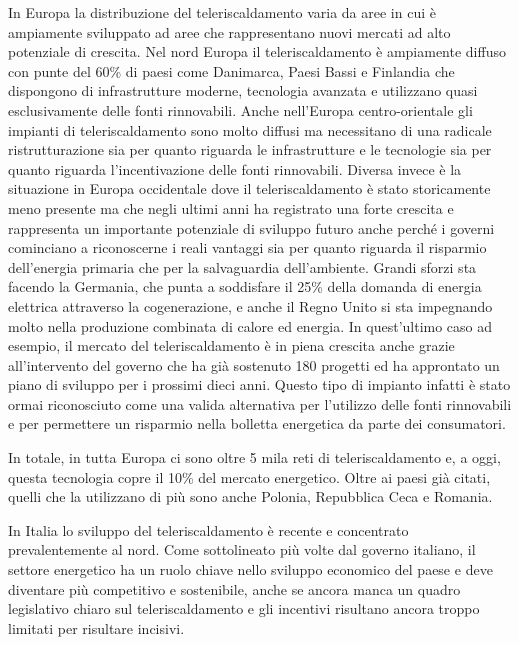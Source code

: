 \documentclass[laurea,oneside,11pt]{USiena_tesiLM}
\begin{document}
In Europa la distribuzione del teleriscaldamento varia da aree in cui è ampiamente sviluppato ad aree che rappresentano nuovi mercati ad alto potenziale di crescita.
Nel nord Europa il teleriscaldamento è ampiamente diffuso con punte del 60\% di paesi come Danimarca, Paesi Bassi e Finlandia che dispongono di infrastrutture moderne, tecnologia avanzata e utilizzano quasi esclusivamente delle fonti rinnovabili. Anche nell'Europa centro-orientale gli impianti di teleriscaldamento sono molto diffusi ma necessitano di una radicale ristrutturazione sia per quanto riguarda le infrastrutture e le tecnologie sia per quanto riguarda l'incentivazione delle fonti rinnovabili. Diversa invece è la situazione in Europa occidentale dove il teleriscaldamento è stato storicamente meno presente ma che negli ultimi anni ha registrato una forte crescita e rappresenta un importante potenziale di sviluppo futuro anche perché i governi cominciano a riconoscerne i reali vantaggi sia per quanto riguarda il risparmio dell'energia primaria che per la salvaguardia dell'ambiente.
Grandi sforzi sta facendo la Germania, che punta a soddisfare il 25\% della domanda di energia elettrica attraverso la cogenerazione, e anche il Regno Unito si sta impegnando molto nella produzione combinata di calore ed energia.
In quest'ultimo caso ad esempio, il mercato del teleriscaldamento è  in piena crescita anche grazie all'intervento del governo che ha già sostenuto 180 progetti ed ha approntato un piano di sviluppo per i prossimi dieci anni. Questo tipo di impianto infatti è stato ormai riconosciuto come una valida alternativa per l'utilizzo delle fonti rinnovabili e per permettere un risparmio nella bolletta energetica da parte dei consumatori.

In totale, in tutta Europa ci sono oltre 5 mila reti di teleriscaldamento e, a oggi, questa tecnologia copre il 10\% del mercato energetico. Oltre ai paesi già citati, quelli che la utilizzano di più sono anche Polonia, Repubblica Ceca e Romania.

In Italia lo sviluppo del teleriscaldamento è recente e concentrato prevalentemente al nord. Come sottolineato più volte dal governo italiano, il settore energetico ha un ruolo chiave nello sviluppo economico del paese e deve diventare più competitivo e sostenibile, anche se ancora manca un quadro legislativo chiaro sul teleriscaldamento e gli incentivi risultano ancora troppo limitati per risultare incisivi. 
 
\end{document}
